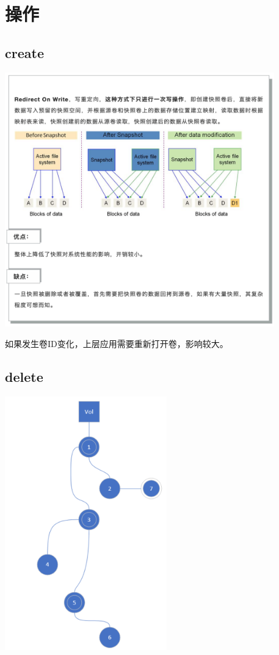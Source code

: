 \section{操作}

\subsection{create}

\begin{center}
\includegraphics[height=11cm]{../imgs/row-snapshot.png}
\end{center}

如果发生卷ID变化，上层应用需要重新打开卷，影响较大。

\subsection{delete}

\begin{center}
\includegraphics[height=11cm]{../imgs/snaptree.png}
\end{center}


